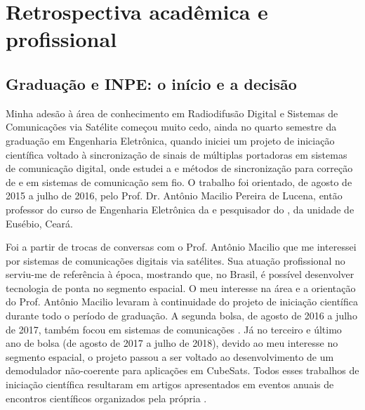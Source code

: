 \documentclass{article}
\begin{document}
\section{Retrospectiva acadêmica e profissional}

\subsection{Graduação e INPE: o início e a decisão}

Minha adesão à área de conhecimento em Radiodifusão Digital e Sistemas de Comunicações via Satélite começou muito cedo, ainda no quarto semestre da graduação em Engenharia Eletrônica, quando iniciei um projeto de iniciação científica voltado à sincronização de sinais de múltiplas portadoras em sistemas de comunicação digital, onde estudei a  e métodos de sincronização para correção de  e  em sistemas de comunicação sem fio. O trabalho foi orientado, de agosto de 2015 a julho de 2016, pelo Prof. Dr. Antônio Macilio Pereira de Lucena, então professor do curso de Engenharia Eletrônica da  e pesquisador do , da unidade de Eusébio, Ceará.

Foi a partir de trocas de conversas com o Prof. Antônio Macilio que me interessei por sistemas de comunicações digitais via satélites. Sua atuação profissional no  serviu-me de referência à época, mostrando que, no Brasil, é possível desenvolver tecnologia de ponta no segmento espacial. O meu interesse na área e a orientação do Prof. Antônio Macilio levaram à continuidade do projeto de iniciação científica durante todo o período de graduação. A segunda bolsa, de agosto de 2016 a julho de 2017, também focou em sistemas de comunicações . Já no terceiro e último ano de bolsa (de agosto de 2017 a julho de 2018), devido ao meu interesse no segmento espacial, o projeto passou a ser voltado ao desenvolvimento de um demodulador  não-coerente para aplicações em CubeSats. Todos esses trabalhos de iniciação científica resultaram em artigos apresentados em eventos anuais de encontros científicos organizados pela própria .
\end{document}
